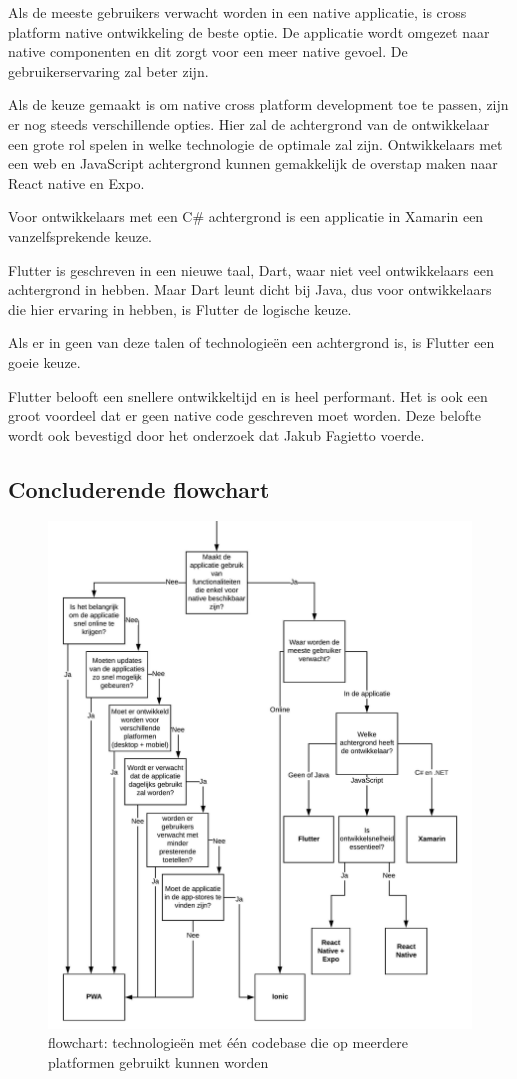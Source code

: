 		Als de meeste gebruikers verwacht worden in een native applicatie, is cross platform native ontwikkeling de beste optie. De applicatie wordt omgezet naar native componenten en dit zorgt voor een meer native gevoel. De gebruikerservaring zal beter zijn.
		
		Als de keuze gemaakt is om native cross platform development toe te passen, zijn er nog steeds verschillende opties. Hier zal de achtergrond van de ontwikkelaar een grote rol spelen in welke technologie de optimale zal zijn. Ontwikkelaars met een web en JavaScript achtergrond kunnen gemakkelijk de overstap maken naar React native en Expo. 
		
		Voor ontwikkelaars met een C\# achtergrond is een applicatie in Xamarin een vanzelfsprekende keuze. 
		
		Flutter is geschreven in een nieuwe taal, Dart,  waar niet veel ontwikkelaars een achtergrond in hebben. Maar Dart leunt dicht bij Java, dus voor ontwikkelaars die hier ervaring in hebben, is Flutter de logische keuze.
		
		Als er in geen van deze talen of technologieën een achtergrond is, is Flutter een goeie keuze.
		\autocite{Leler2017}
		\autocite{Wenhao2018}
		
		Flutter belooft een snellere ontwikkeltijd en is heel performant. Het is ook een groot voordeel dat er geen native code geschreven moet worden.
		Deze belofte wordt ook bevestigd door het onderzoek dat Jakub Fagietto voerde.
		\autocite{Fagietto2019}
		
		\newpage
		\subsection{Concluderende flowchart}
		\begin{figure}[H]
			\centering
			\includegraphics[width=165mm]{./img/flowchart.jpeg}
			\caption{flowchart: technologieën met één codebase die op meerdere platformen gebruikt kunnen worden}
		\end{figure}
		
		\newpage